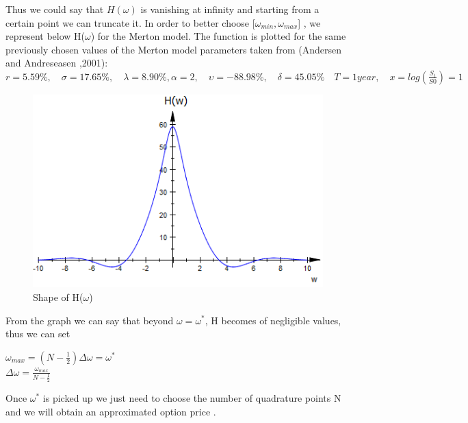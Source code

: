\documentclass[12pt]{report}
\begin{document}
Thus we could say that $H(\omega)$ is vanishing at infinity and starting from a certain point we can truncate it. In order to better choose [$\omega_{min},\omega_{max}$] , we represent below H($\omega$) for the Merton model. The function is plotted for the same previously chosen values of the Merton model parameters taken from (Andersen and Andreseasen ,2001):\\ 
$ r =5.59 \%,\quad \sigma=17.65\%,\quad  \lambda=8.90\%, \alpha=2,\quad \upsilon = -88.98\%,\quad  \delta=45.05\% \quad T=1 year,\quad x=log(\frac{S_t}{S0})=1 $ 
\\
\begin{figure}[H]
\centering
\includegraphics{H.png} 
\caption{Shape of H($\omega$)}
\label{H(w)}
\end{figure}

 
From the graph we can say that beyond $\omega=\omega^* $, H becomes of negligible values, thus we can set
\begin{center}
$\omega_{max}=(N-\frac{1}{2})\Delta \omega=\omega^*$\\
$\Delta \omega= \frac{\omega_{max}}{N-\frac{1}{2}}$
\end{center} 

Once $\omega^*$ is picked up we just need to choose the number of quadrature points N and we will obtain an approximated option price .
\end{document}
